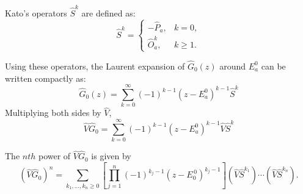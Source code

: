 \begin{definition}
    Kato’s operators $\hat S^k$ are defined as:
    \begin{equation} \label{eq:kato_operators_S_k}
        \hat S^k=
        \begin{cases}
            -\hat P_a,& k=0,\\[2pt]
            \hat O_a^k,& k\ge 1.
        \end{cases}
    \end{equation}
\end{definition}

Using these operators, the Laurent expansion of $\hat G_0(z)$ around
$E_a^0$ can be written compactly as:
\begin{equation} \label{eq:G0_laurent_kato}
    \hat G_0(z)=\sum_{k=0}^{\infty}(-1)^{k-1}(z-E_a^0)^{k-1} \hat S^k
\end{equation}
Multiplying both sides by $\hat V$,
\begin{equation}
    \hat V \hat G _{0} = \sum _{k=0}^{\infty} (-1) ^{k-1}(z - E
    _{a}^{0})^{k-1} \hat V \hat S ^{k}
\end{equation}
\begin{lemma} 
    The $nth$ power of $\hat V \hat G_0$ is given by
    \begin{equation}
        (\hat V\hat G_0)^n
        =\sum_{k_1,\ldots,k_n\ge 0}
        \left[\prod_{j=1}^{n}(-1)^{k_j-1}(z-E_0^{\,0})^{k_j-1}\right]
        (\hat V\hat S^{k_1})\cdots(\hat V\hat S^{k_n}).
    \end{equation}

\end{lemma}

